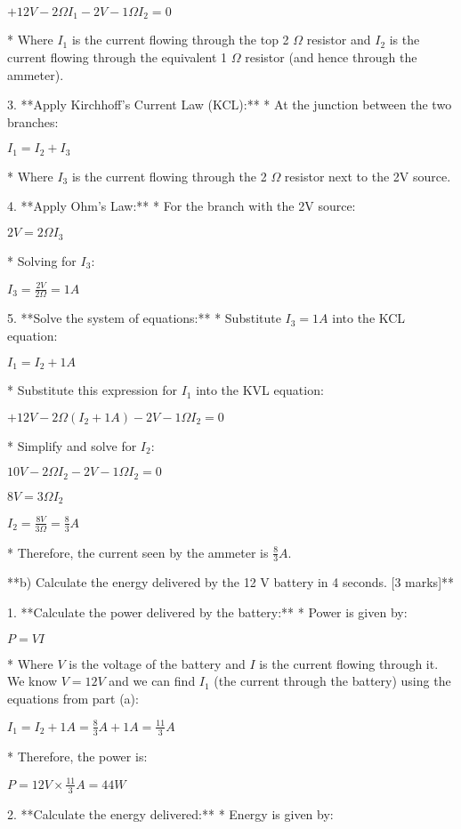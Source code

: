 \documentclass{article}
\begin{document}
    $+12V - 2\Omega I_1 - 2V - 1\Omega I_2 = 0$

    * Where $I_1$ is the current flowing through the top 2 $\Omega$ resistor and $I_2$ is the current flowing through the equivalent 1 $\Omega$ resistor (and hence through the ammeter).

3. **Apply Kirchhoff's Current Law (KCL):**
    * At the junction between the two branches:

    $I_1 = I_2 + I_3$

    * Where $I_3$ is the current flowing through the 2 $\Omega$ resistor next to the 2V source.

4. **Apply Ohm's Law:**
    * For the branch with the 2V source:

    $2V = 2\Omega I_3$

    * Solving for $I_3$:

    $I_3 = \frac{2V}{2\Omega} = 1A$

5. **Solve the system of equations:**
    * Substitute $I_3 = 1A$ into the KCL equation:

    $I_1 = I_2 + 1A$

    * Substitute this expression for $I_1$ into the KVL equation:

    $+12V - 2\Omega (I_2 + 1A) - 2V - 1\Omega I_2 = 0$

    * Simplify and solve for $I_2$:

    $10V - 2\Omega I_2 - 2V - 1\Omega I_2 = 0$

    $8V = 3\Omega I_2$

    $I_2 = \frac{8V}{3\Omega} = \frac{8}{3} A$

    * Therefore, the current seen by the ammeter is $\frac{8}{3} A$.

**b) Calculate the energy delivered by the 12 V battery in 4 seconds. [3 marks]**

1. **Calculate the power delivered by the battery:**
    * Power is given by:

    $P = VI$

    * Where $V$ is the voltage of the battery and $I$ is the current flowing through it.  We know $V = 12V$ and we can find $I_1$ (the current through the battery) using the equations from part (a):

    $I_1 = I_2 + 1A = \frac{8}{3} A + 1A = \frac{11}{3} A$

    * Therefore, the power is:

    $P = 12V \times \frac{11}{3} A = 44W$

2. **Calculate the energy delivered:**
    * Energy is given by:
\end{document}
